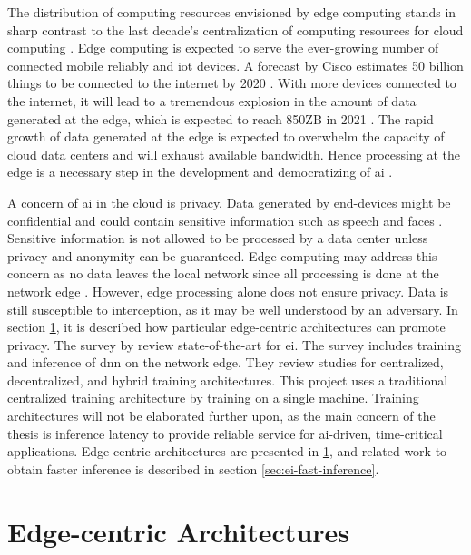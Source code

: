 The distribution of computing resources envisioned by edge computing stands in sharp contrast to the last decade's centralization of computing resources for cloud computing \cite{shi_edge_2016}. Edge computing is expected to serve the ever-growing number of connected mobile reliably and \gls{iot} devices. A forecast by Cisco estimates 50 billion things to be connected to the internet by 2020 \cite{evans_internet_2011}. With more devices connected to the internet, it will lead to a tremendous explosion in the amount of data generated at the edge, which is expected to reach 850ZB in 2021 \cite{cisco_cisco_2018}. The rapid growth of data generated at the edge is expected to overwhelm the capacity of cloud data centers and will exhaust available bandwidth. Hence processing at the edge is a necessary step in the development and democratizing of \gls{ai} \cite{zhou_edge_2019}.

A concern of \gls{ai} in the cloud is privacy. Data generated by end-devices might be confidential and could contain sensitive information such as speech and faces \cite{chen_deep_2019}. Sensitive information is not allowed to be processed by a data center unless privacy and anonymity can be guaranteed. Edge computing may address this concern as no data leaves the local network since all processing is done at the network edge \cite{chen_deep_2019}. However, edge processing alone does not ensure privacy. Data is still susceptible to interception, as it may be well understood by an adversary. In section \ref{sec:ei-architecture}, it is described how particular edge-centric architectures can promote privacy. 
The survey  by \citet{zhou_edge_2019} review state-of-the-art for \gls{ei}. The survey includes training and inference of \gls{dnn} on the network edge. They review studies for centralized, decentralized, and hybrid training architectures. This project uses a traditional centralized training architecture by training on a single machine. Training architectures will not be elaborated further upon, as the main concern of the thesis is inference latency to provide reliable service for \gls{ai}-driven, time-critical applications. Edge-centric architectures are presented in \ref{sec:ei-architecture}, and related work to obtain faster inference is described in section \ref{sec:ei-fast-inference}. 

\newpage
\section{Edge-centric Architectures} \label{sec:ei-architecture}


